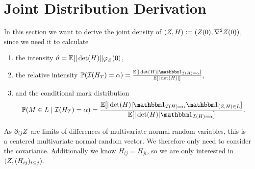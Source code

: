 \section{Joint Distribution Derivation}


In this section we want to derive the joint density of \((Z, H):=
(Z(0), \nabla^2Z(0))\), since we need it to calculate
\begin{enumerate}
	\item the intensity \(\vartheta = \mathbb{E}[|\det(H)|]\varphi_Z(0)\),
	\item the relative intensity \(\Pr(\negEV(H_T) = \alpha) =
	\frac{\E[|\det(H)|\ind_{\negEV(H)=\alpha}]}{\E[|\det(H)|]} \),
	\item and the conditional mark distribution
	\[
		\Pr(\Mark\in L\mid \negEV(H_T) = \alpha)
		= \frac{
			\E[|\det(H)|\ind_{\negEV(H) = \alpha}\ind_{(Z,H)\in L}]
		}{\E[|\det(H)|\ind_{\negEV(H) = \alpha}]}.
	\]
\end{enumerate}
As \(\partial_{ij}Z\) are limits of differences of multivariate
normal random variables, this is a centered multivariate normal
random vector. We therefore only need to consider the covariance. Additionally
we know \(H_{ij} = H_{ji}\), so we are only interested
in \((Z, (H_{ij})_{i\le j})\).

